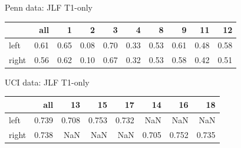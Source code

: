 \documentclass[ignorenonframetext,]{beamer}
\begin{document}
\begin{frame}{Penn data: JLF T1-only}

\begin{longtable}[c]{@{}lrrrrrrrrr@{}}
\toprule
& all & 1 & 2 & 3 & 4 & 8 & 9 & 11 & 12\tabularnewline
\midrule
\endhead
left & 0.61 & 0.65 & 0.08 & 0.70 & 0.33 & 0.53 & 0.61 & 0.48 &
0.58\tabularnewline
right & 0.56 & 0.62 & 0.10 & 0.67 & 0.32 & 0.53 & 0.58 & 0.42 &
0.51\tabularnewline
\bottomrule
\end{longtable}

\end{frame}

\begin{frame}{UCI data: JLF T1-only}

\begin{longtable}[c]{@{}lrrrrrrr@{}}
\toprule
& all & 13 & 15 & 17 & 14 & 16 & 18\tabularnewline
\midrule
\endhead
left & 0.739 & 0.708 & 0.753 & 0.732 & NaN & NaN & NaN\tabularnewline
right & 0.738 & NaN & NaN & NaN & 0.705 & 0.752 & 0.735\tabularnewline
\bottomrule
\end{longtable}

\hypertarget{refs}{}

\end{frame}
\end{document}
